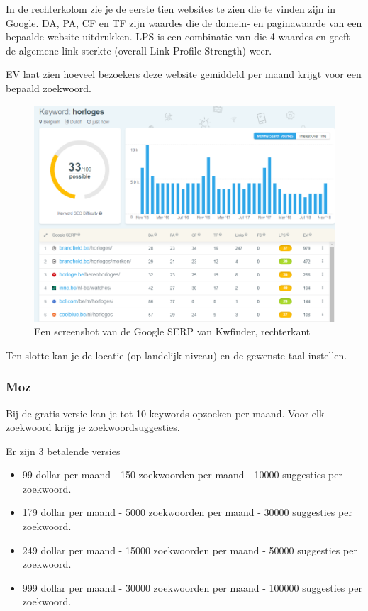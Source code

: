In de rechterkolom zie je de eerste tien websites te zien die te vinden zijn in Google. DA, PA, CF en TF zijn waardes die de domein- en paginawaarde van een bepaalde website uitdrukken. LPS is een combinatie van die 4 waardes en geeft de algemene link sterkte (overall Link Profile Strength) weer. 

EV laat zien hoeveel bezoekers deze website gemiddeld per maand krijgt voor een bepaald zoekwoord. 

\begin{figure}[h!]
\centering
\includegraphics[width=\linewidth]{img/kwfinderrechts.PNG}
\caption{Een screenshot van de Google SERP van Kwfinder, rechterkant \autocite{kwfinder}}
\end{figure}

Ten slotte kan je de locatie (op landelijk niveau) en de gewenste taal instellen.

\subsubsection{Moz}
\label{ch: Moz}

Bij de gratis versie kan je tot 10 keywords opzoeken per maand. Voor elk zoekwoord krijg je zoekwoordsuggesties.

Er zijn 3 betalende versies 

\begin{itemize}
\item 99 dollar per maand - 150 zoekwoorden per maand - 10000 suggesties per zoekwoord.
\item 179 dollar per maand - 5000 zoekwoorden per maand - 30000 suggesties per zoekwoord.
\item 249 dollar per maand - 15000 zoekwoorden per maand - 50000 suggesties per zoekwoord.
\item 999 dollar per maand - 30000 zoekwoorden per maand - 100000 suggesties per zoekwoord.
\end{itemize}

